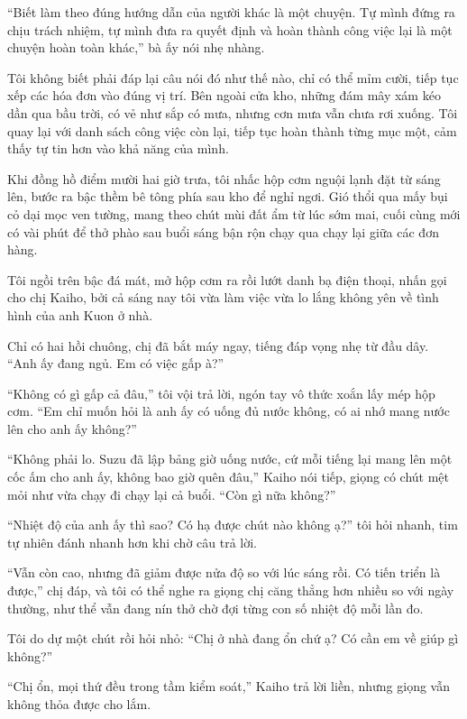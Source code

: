 \documentclass[../main.tex]{subfiles}
\begin{document}
``Biết làm theo đúng hướng dẫn của người khác là một chuyện. Tự mình đứng ra chịu trách nhiệm, tự mình đưa ra quyết định và hoàn thành công việc lại là một chuyện hoàn toàn khác,'' bà ấy nói nhẹ nhàng.

Tôi không biết phải đáp lại câu nói đó như thế nào, chỉ có thể mỉm cười, tiếp tục xếp các hóa đơn vào đúng vị trí. Bên ngoài cửa kho, những đám mây xám kéo dần qua bầu trời, có vẻ như sắp có mưa, nhưng cơn mưa vẫn chưa rơi xuống. Tôi quay lại với danh sách công việc còn lại, tiếp tục hoàn thành từng mục một, cảm thấy tự tin hơn vào khả năng của mình.

\ct

Khi đồng hồ điểm mười hai giờ trưa, tôi nhấc hộp cơm nguội lạnh đặt từ sáng lên, bước ra bậc thềm bê tông phía sau kho để nghỉ ngơi. Gió thổi qua mấy bụi cỏ dại mọc ven tường, mang theo chút mùi đất ẩm từ lúc sớm mai, cuối cùng mới có vài phút để thở phào sau buổi sáng bận rộn chạy qua chạy lại giữa các đơn hàng. 

Tôi ngồi trên bậc đá mát, mở hộp cơm ra rồi lướt danh bạ điện thoại, nhấn gọi cho chị Kaiho, bởi cả sáng nay tôi vừa làm việc vừa lo lắng không yên về tình hình của anh Kuon ở nhà.

Chỉ có hai hồi chuông, chị đã bắt máy ngay, tiếng đáp vọng nhẹ từ đầu dây. ``Anh ấy đang ngủ. Em có việc gấp à?''

``Không có gì gấp cả đâu,'' tôi vội trả lời, ngón tay vô thức xoắn lấy mép hộp cơm. ``Em chỉ muốn hỏi là anh ấy có uống đủ nước không, có ai nhớ mang nước lên cho anh ấy không?''

``Không phải lo. Suzu đã lập bảng giờ uống nước, cứ mỗi tiếng lại mang lên một cốc ấm cho anh ấy, không bao giờ quên đâu,'' Kaiho nói tiếp, giọng có chút mệt mỏi như vừa chạy đi chạy lại cả buổi. ``Còn gì nữa không?''

``Nhiệt độ của anh ấy thì sao? Có hạ được chút nào không ạ?'' tôi hỏi nhanh, tim tự nhiên đánh nhanh hơn khi chờ câu trả lời.

``Vẫn còn cao, nhưng đã giảm được nửa độ so với lúc sáng rồi. Có tiến triển là được,'' chị đáp, và tôi có thể nghe ra giọng chị căng thẳng hơn nhiều so với ngày thường, như thể vẫn đang nín thở chờ đợi từng con số nhiệt độ mỗi lần đo.

Tôi do dự một chút rồi hỏi nhỏ: ``Chị ở nhà đang ổn chứ ạ? Có cần em về giúp gì không?''

``Chị ổn, mọi thứ đều trong tầm kiểm soát,'' Kaiho trả lời liền, nhưng giọng vẫn không thỏa được cho lắm.
\end{document}
